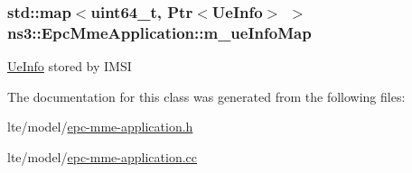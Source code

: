 \subsubsection[{\texorpdfstring{m\+\_\+ue\+Info\+Map}{m_ueInfoMap}}]{\setlength{\rightskip}{0pt plus 5cm}std\+::map$<$uint64\+\_\+t, {\bf Ptr}$<${\bf Ue\+Info}$>$ $>$ ns3\+::\+Epc\+Mme\+Application\+::m\+\_\+ue\+Info\+Map\hspace{0.3cm}{\ttfamily [private]}}\hypertarget{classns3_1_1EpcMmeApplication_a1f33ca8847355e961f6c290dfb6e16e6}{}\label{classns3_1_1EpcMmeApplication_a1f33ca8847355e961f6c290dfb6e16e6}
\hyperlink{structns3_1_1EpcMmeApplication_1_1UeInfo}{Ue\+Info} stored by I\+M\+SI 

The documentation for this class was generated from the following files\+:\begin{DoxyCompactItemize}
\item 
lte/model/\hyperlink{epc-mme-application_8h}{epc-\/mme-\/application.\+h}\item 
lte/model/\hyperlink{epc-mme-application_8cc}{epc-\/mme-\/application.\+cc}\end{DoxyCompactItemize}
